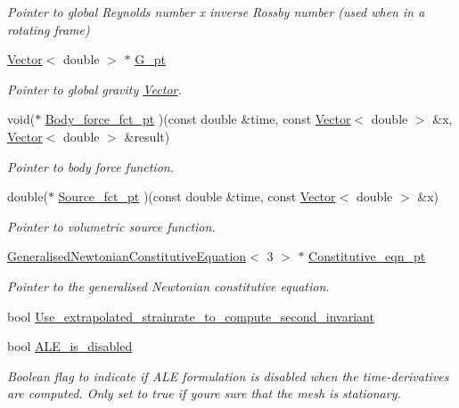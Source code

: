 \begin{DoxyCompactItemize}
\begin{DoxyCompactList}\small\item\em Pointer to global Reynolds number x inverse Rossby number (used when in a rotating frame) \end{DoxyCompactList}\item 
\hyperlink{classoomph_1_1Vector}{Vector}$<$ double $>$ $\ast$ \hyperlink{classoomph_1_1GeneralisedNewtonianAxisymmetricNavierStokesEquations_ae7b5e1db1180baf5f36ea18c5406ebf7}{G\+\_\+pt}
\begin{DoxyCompactList}\small\item\em Pointer to global gravity \hyperlink{classoomph_1_1Vector}{Vector}. \end{DoxyCompactList}\item 
void($\ast$ \hyperlink{classoomph_1_1GeneralisedNewtonianAxisymmetricNavierStokesEquations_a9bc42f8d7b8dec91e17be496886b2c0e}{Body\+\_\+force\+\_\+fct\+\_\+pt} )(const double \&time, const \hyperlink{classoomph_1_1Vector}{Vector}$<$ double $>$ \&x, \hyperlink{classoomph_1_1Vector}{Vector}$<$ double $>$ \&result)
\begin{DoxyCompactList}\small\item\em Pointer to body force function. \end{DoxyCompactList}\item 
double($\ast$ \hyperlink{classoomph_1_1GeneralisedNewtonianAxisymmetricNavierStokesEquations_aaf1dab41fe5c1d453eb52462a9315858}{Source\+\_\+fct\+\_\+pt} )(const double \&time, const \hyperlink{classoomph_1_1Vector}{Vector}$<$ double $>$ \&x)
\begin{DoxyCompactList}\small\item\em Pointer to volumetric source function. \end{DoxyCompactList}\item 
\hyperlink{classoomph_1_1GeneralisedNewtonianConstitutiveEquation}{Generalised\+Newtonian\+Constitutive\+Equation}$<$ 3 $>$ $\ast$ \hyperlink{classoomph_1_1GeneralisedNewtonianAxisymmetricNavierStokesEquations_a5bee3e30afd3e82c9cdec5c57466366a}{Constitutive\+\_\+eqn\+\_\+pt}
\begin{DoxyCompactList}\small\item\em Pointer to the generalised Newtonian constitutive equation. \end{DoxyCompactList}\item 
bool \hyperlink{classoomph_1_1GeneralisedNewtonianAxisymmetricNavierStokesEquations_a52ff528ce3ada2d6a66a65761d79305b}{Use\+\_\+extrapolated\+\_\+strainrate\+\_\+to\+\_\+compute\+\_\+second\+\_\+invariant}
\item 
bool \hyperlink{classoomph_1_1GeneralisedNewtonianAxisymmetricNavierStokesEquations_af13e702da0e58eba19e840fe648d341d}{A\+L\+E\+\_\+is\+\_\+disabled}
\begin{DoxyCompactList}\small\item\em Boolean flag to indicate if A\+LE formulation is disabled when the time-\/derivatives are computed. Only set to true if you\textquotesingle{}re sure that the mesh is stationary. \end{DoxyCompactList}\end{DoxyCompactItemize}
